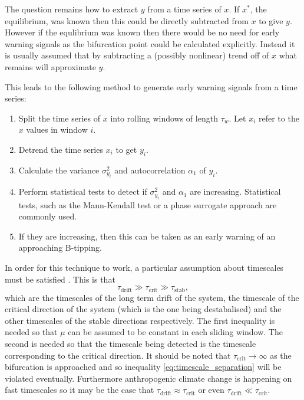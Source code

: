 The question remains how to extract $y$ from a time series of $x$. If $x^*$, the equilibrium, was known then this could be directly subtracted from $x$ to give $y$. However if the equlibrium was known
then there would be no need for early warning signals as the bifurcation point could be calculated explicitly. Instead it is usually assumed that by subtracting a (possibly nonlinear) trend
off of $x$ what remains will approximate $y$.

This leads to the following method to generate early warning signals from a time series:
\begin{enumerate}
\item Split the time series of $x$ into rolling windows of length $\tau_w$. Let $x_i$ refer to the $x$ values in window $i$.
\item Detrend the time series $x_i$ to get $y_i$.
\item Calculate the variance $\sigma^2_{y_i}$ and autocorrelation $\alpha_{1}$ of $y_i$.
\item Perform statistical tests to detect if $\sigma^2_{y_i}$ and  $\alpha_{1}$ are increasing. Statistical tests, such as the Mann-Kendall test \parencite{Wilks2019} or a phase
  surrogate approach \parencite{Boettner2022} are commonly used.
\item If they are increasing, then this can be taken as an early warning of an approaching B-tipping. 
\end{enumerate}

In order for this technique to work, a particular assumption about timescales must be satisfied \parencite{Thompson2011b}. This is that
\begin{equation}
  \label{eq:timescale_separation}
  \tau_{\mathrm{drift}} \gg \tau_{\mathrm{crit}} \gg \tau_{\mathrm{stab}},
\end{equation}
which are the timescales of the long term drift of the system, the timescale of the critical direction of the system (which is the one being destabalised) and the other timescales of the stable directions
respectively. The first inequality is needed so that $\mu$ can be assumed to be constant in each sliding window. The second is needed so that the timescale being detected is the timescale corresponding
to the critical direction. It should be noted that $\tau_{\mathrm{crit}} \rightarrow \infty$ as the bifurcation is approached and so inequality \ref{eq:timescale_separation}
will be violated eventually. Furthermore anthropogenic climate change is happening on fast
timescales so it may be the case that $\tau_{\mathrm{drift}} \approx \tau_{\mathrm{crit}}$ or even $\tau_{\mathrm{drift}} \ll \tau_{\mathrm{crit}}$.

